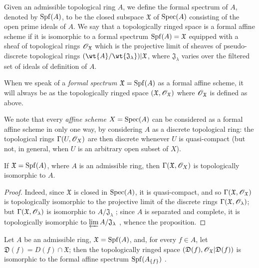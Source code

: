 \begin{definition}[10.1.2]
\label{1.10.1.2}
Given an admissible topological ring $A$, we define the formal spectrum of $A$, denoted by $\operatorname{Spf}(A)$, to be the closed subspace $\mathfrak{X}$ of $\operatorname{Spec}(A)$ consisting of the open prime ideals of $A$.
We say that a topologically ringed space is a formal affine scheme if it is isomorphic to a formal spectrum $\operatorname{Spf}(A)=\mathfrak{X}$ equipped with a sheaf of topological rings $\mathscr{O}_\mathfrak{X}$ which is the projective limit of sheaves of pseudo-discrete topological rings $(\wt{A}/\wt{\mathfrak{J}_\lambda})|\mathfrak{X}$, where $\mathfrak{J}_\lambda$ varies over the filtered set of ideals of definition of $A$.
\end{definition}

When we speak of a \emph{formal spectrum $\mathfrak{X}=\operatorname{Spf}(A)$} as a formal affine scheme, it will always be as the topologically ringed space $(\mathfrak{X},\mathscr{O}_\mathfrak{X})$ where $\mathscr{O}_\mathfrak{X}$ is defined as above.

We note that every \emph{affine scheme} $X=\operatorname{Spec}(A)$ can be considered as a formal affine scheme in only one way, by considering $A$ as a discrete topological ring: the topological rings $\Gamma(U,\mathscr{O}_X)$ are then discrete whenever $U$ is quasi-compact (but not, in general, when $U$ is an arbitrary open subset of $X$).

\begin{proposition}[10.1.3]
\label{1.10.1.3}
If $\mathfrak{X}=\operatorname{Spf}(A)$, where $A$ is an admissible ring, then $\Gamma(\mathfrak{X},\mathscr{O}_X)$ is topologically isomorphic to $A$.
\end{proposition}

\begin{proof}
\label{proof-1.10.1.3}
Indeed, since $\mathfrak{X}$ is closed in $\operatorname{Spec}(A)$, it is quasi-compact, and so $\Gamma(\mathfrak{X},\mathscr{O}_\mathfrak{X})$ is topologically isomorphic to the projective limit of the discrete rings $\Gamma(\mathfrak{X},\mathscr{O}_\lambda)$; but $\Gamma(\mathfrak{X},\mathscr{O}_\lambda)$ is isomorphic to $A/\mathfrak{J}_\lambda$ ; since $A$ is separated and complete, it is topologically isomorphic to $\varprojlim A/\mathfrak{J}_\lambda$ , whence the proposition.
\end{proof}

\begin{proposition}[10.1.4]
\label{1.10.1.4}
Let $A$ be an admissible ring, $\mathfrak{X}=\operatorname{Spf}(A)$, and, for every $f\in A$, let $\mathfrak{D}(f)=D(f)\cap\mathfrak{X}$; then the topologically ringed space $(\mathfrak{D}(f),\mathscr{O}_\mathfrak{X}|\mathfrak{D}(f))$ is isomorphic to the formal affine spectrum $\operatorname{Spf}(A_{\{f\}})$ .
\end{proposition}

